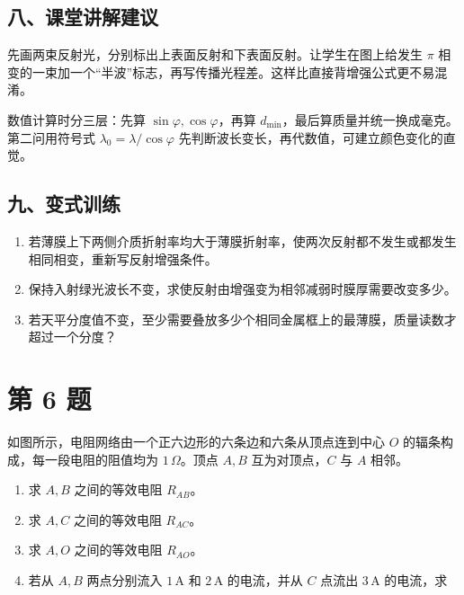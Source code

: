 \documentclass[12pt,a4paper,UTF8]{ctexart}
\newcommand{\tightlist}{\setlength{\itemsep}{0pt}\setlength{\parskip}{0pt}}
\begin{document}
\subsection{八、课堂讲解建议}\label{ux516bux8bfeux5802ux8bb2ux89e3ux5efaux8bae-4}

先画两束反射光，分别标出上表面反射和下表面反射。让学生在图上给发生
\(\pi\)
相变的一束加一个``半波''标志，再写传播光程差。这样比直接背增强公式更不易混淆。

数值计算时分三层：先算 \(\sin\varphi,\cos\varphi\)，再算
\(d_{\min}\)，最后算质量并统一换成毫克。第二问用符号式
\(\lambda_0=\lambda/\cos\varphi\)
先判断波长变长，再代数值，可建立颜色变化的直觉。

\subsection{九、变式训练}\label{ux4e5dux53d8ux5f0fux8badux7ec3-4}

\begin{enumerate}
\def\labelenumi{\arabic{enumi}.}
\tightlist
\item
  若薄膜上下两侧介质折射率均大于薄膜折射率，使两次反射都不发生或都发生相同相变，重新写反射增强条件。
\item
  保持入射绿光波长不变，求使反射由增强变为相邻减弱时膜厚需要改变多少。
\item
  若天平分度值不变，至少需要叠放多少个相同金属框上的最薄膜，质量读数才超过一个分度？
\end{enumerate}

\newpage

\section{第 6 题}\label{ux7b2c-6-ux9898}

如图所示，电阻网络由一个正六边形的六条边和六条从顶点连到中心 \(O\)
的辐条构成，每一段电阻的阻值均为 \(1\,\Omega\)。顶点 \(A,B\)
互为对顶点，\(C\) 与 \(A\) 相邻。

\begin{enumerate}
\def\labelenumi{\arabic{enumi}.}
\tightlist
\item
  求 \(A,B\) 之间的等效电阻 \(R_{AB}\)。
\item
  求 \(A,C\) 之间的等效电阻 \(R_{AC}\)。
\item
  求 \(A,O\) 之间的等效电阻 \(R_{AO}\)。
\item
  若从 \(A,B\) 两点分别流入 \(1\,\mathrm A\) 和 \(2\,\mathrm A\)
  的电流，并从 \(C\) 点流出 \(3\,\mathrm A\) 的电流，求
\end{enumerate}
\end{document}
